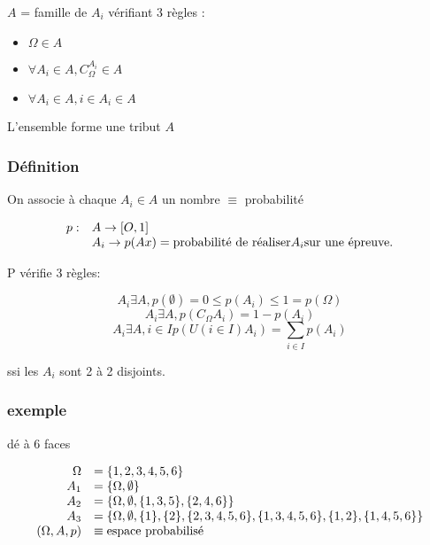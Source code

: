 \documentclass[]{article}
\begin{document}
$A$ = famille de $A_i$ vérifiant 3 règles :

\begin{itemize}
\itemsep1pt\parskip0pt
\item
  $\Omega \in A$
\item
  $\forall A_i \in A, C_\Omega ^{A_i} \in A$
\item
  $\forall A_i \in A, i \in A_i \in A$
\end{itemize}

L'ensemble forme une tribut $A$

\subsubsection{Définition}

On associe à chaque $A_i \in A$ un nombre $\equiv$ probabilité

\begin{displaymath}
\begin{array}{r l}
p: & A \rightarrow [O,1] \\
   & A_i \rightarrow p(Ax) = \text{probabilité de réaliser} A_i \text{sur une épreuve.} \\
\end{array}
\end{displaymath}

P vérifie 3 règles:

\[A_i \exists A, p(\emptyset) = 0 \leq p(A_i) \leq 1 = p(\Omega)\]
\[A_i \exists A, p(C_\Omega A_i) = 1 - p(A_i)\]
\[A_i \exists A, i \in I p(U(i\in I) A_i)  = \sum_{i\in I} p(A_i)\]

ssi les $A_i$ sont 2 à 2 disjoints.

\subsubsection{exemple}

dé à 6 faces

\begin{displaymath}
\begin{array}{r l}
\Omega & = \{1,2,3,4,5,6\} \\
A_1 & = \{\Omega, \emptyset\} \\
A_2 & = \{\Omega, \emptyset, \{1,3,5\},\{2,4,6\}\} \\
A_3 & = \{\Omega, \emptyset, \{1\}, \{2\}, \{2,3,4,5,6\}, \{1,3,4,5,6\}, \{1,2\}, \{1,4,5,6\}\} \\
(\Omega, A, p) & \equiv \text{espace probabilisé}
\end{array}
\end{displaymath}
\end{document}
